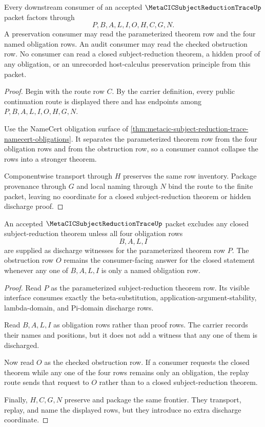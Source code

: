 \begin{theorem}
\label{thm:metacic-subject-reduction-trace-nonescape}
Every downstream consumer of an accepted $\MetaCICSubjectReductionTraceUp$ packet factors through
$$
P,B,A,L,I,O,H,C,G,N.
$$
A preservation consumer may read the parameterized theorem row and the four named obligation rows. An audit consumer may read the checked obstruction row. No consumer can read a closed subject-reduction theorem, a hidden proof of any obligation, or an unrecorded host-calculus preservation principle from this packet.
\end{theorem}
\begin{proof}
Begin with the route row $C$. By the carrier definition, every public continuation route is displayed there and has endpoints among $P,B,A,L,I,O,H,G,N$.

Use the NameCert obligation surface of \autoref{thm:metacic-subject-reduction-trace-namecert-obligations}. It separates the parameterized theorem row from the four obligation rows and from the obstruction row, so a consumer cannot collapse the rows into a stronger theorem.

Componentwise transport through $H$ preserves the same row inventory. Package provenance through $G$ and local naming through $N$ bind the route to the finite packet, leaving no coordinate for a closed subject-reduction theorem or hidden discharge proof.
\end{proof}

\begin{theorem}
\label{thm:metacic-subject-reduction-trace-discharge-frontier}
An accepted $\MetaCICSubjectReductionTraceUp$ packet excludes any closed subject-reduction theorem unless all four obligation rows
$$
B,A,L,I
$$
are supplied as discharge witnesses for the parameterized theorem row $P$. The obstruction row $O$ remains the consumer-facing answer for the closed statement whenever any one of $B,A,L,I$ is only a named obligation row.
\end{theorem}
\begin{proof}
Read $P$ as the parameterized subject-reduction theorem row. Its visible interface consumes exactly the beta-substitution, application-argument-stability, lambda-domain, and Pi-domain discharge rows.

Read $B,A,L,I$ as obligation rows rather than proof rows. The carrier records their names and positions, but it does not add a witness that any one of them is discharged.

Now read $O$ as the checked obstruction row. If a consumer requests the closed theorem while any one of the four rows remains only an obligation, the replay route sends that request to $O$ rather than to a closed subject-reduction theorem.

Finally, $H,C,G,N$ preserve and package the same frontier. They transport, replay, and name the displayed rows, but they introduce no extra discharge coordinate.
\end{proof}

